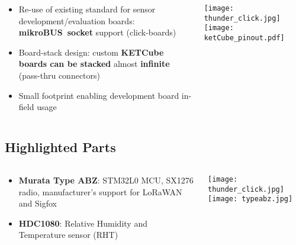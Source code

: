 \begin{frame}%
  \centering
  
    \begin{columns}
      \begin{column}{0.6\paperwidth}
         \centering
         \begin{itemize}
           \item Re-use of existing standard for sensor development/evaluation boards: {\bf mikroBUS\texttrademark~socket} support (click-boards)
           \item Board-stack design: custom {\bf KETCube boards can be stacked} almost {\bf infinite} (pass-thru connectors)
           \item Small footprint enabling development board in-field usage
         \end{itemize}
      \end{column}
      \begin{column}{0.4\paperwidth}
         \centering
         \texttt{[image: thunder\_click.jpg]}
         \vfill
         \texttt{[image: ketCube\_pinout.pdf]}
       \end{column}
    \end{columns}
  
\end{frame}

\subsection{Highlighted Parts}
\begin{frame}%
  \centering
    
    \begin{columns}
      \begin{column}{0.6\paperwidth}
         \centering
         \begin{itemize}
           \item {\bf Murata Type ABZ}: STM32L0 MCU, SX1276 radio, manufacturer's support for LoRaWAN and Sigfox
           \item {\bf HDC1080}: Relative Humidity and Temperature sensor (RHT)
         \end{itemize}
      \end{column}
      \begin{column}{0.4\paperwidth}
         \centering
         \texttt{[image: thunder\_click.jpg]}
         \vfill
         \texttt{[image: typeabz.jpg]}
       \end{column}
    \end{columns}
  
\end{frame}

